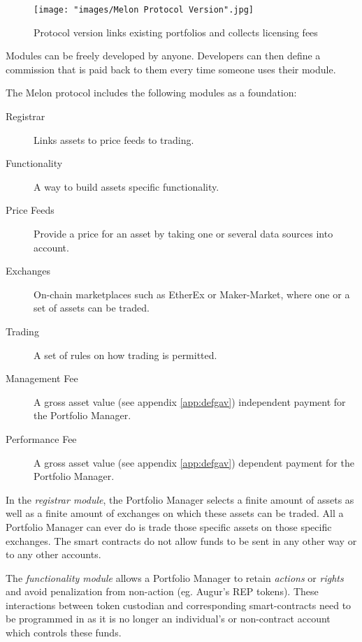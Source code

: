 \documentclass[9pt,oneside]{amsart}
\theoremstyle{plain}
\begin{document}
\begin{figure}[ht!]
	\centering
	\texttt{[image: "images/Melon Protocol Version".jpg]}
	\caption{Protocol version links existing portfolios and collects licensing fees \label{fig:protocolversion}}
\end{figure}

\begin{multicols}{2}

Modules can be freely developed by anyone. Developers can then define a commission that is paid back to them every time someone uses their module.

The Melon protocol includes the following modules as a foundation:

\begin{description}
	\item[Registrar] Links assets to price feeds to trading.
	\item[Functionality] A way to build assets specific functionality.
	\item[Price Feeds] Provide a price for an asset by taking one or several data sources into account.    
	\item[Exchanges] On-chain marketplaces such as EtherEx\cite{etherex} or Maker-Market\cite{maker-market}, where one or a set of assets can be traded.
	\item[Trading] A set of rules on how trading is permitted.
	\item[Management Fee] A gross asset value (see appendix \ref{app:defgav}) independent payment for the Portfolio Manager.
	\item[Performance Fee] A gross asset value (see appendix \ref{app:defgav}) dependent payment for the Portfolio Manager.
\end{description}

In the \textit{registrar module}, the Portfolio Manager selects a finite amount of assets as well as a finite amount of exchanges on which these assets can be traded. All a Portfolio Manager can ever do is trade those specific assets on those specific exchanges. The smart contracts do not allow funds to be sent in any other way or to any other accounts.  

The \textit{functionality module} allows a Portfolio Manager to retain \textit{actions} or \textit{rights} and avoid penalization from non-action (eg. Augur’s REP tokens). These interactions between token custodian and corresponding smart-contracts need to be programmed in as it is no longer an individual's or non-contract account which controls these funds.


\end{multicols}
\end{document}
